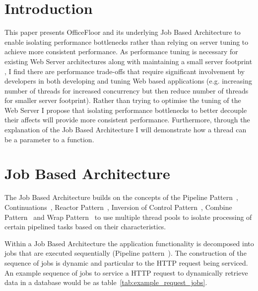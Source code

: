 \documentclass[conference]{ieee/IEEEtran}
\begin{document}
%
\IEEEpeerreviewmaketitle



\section{Introduction}
This paper presents OfficeFloor and its underlying Job Based Architecture to
enable isolating performance bottlenecks rather than relying on server tuning to
achieve more consistent performance. As performance tuning is necessary for
existing Web Server architectures \cite{tuning-important} along with maintaining
a small server footprint \cite{low-server-footprint}, I find there are
performance trade-offs that require significant involvement by developers in
both developing and tuning Web based applications (e.g. increasing number of
threads for increased concurrency but then reduce number of threads for smaller
server footprint).  Rather than trying to optimise the tuning of the Web Server
I propose that isolating performance bottlenecks to better decouple their
affects will provide more consistent performance.  Furthermore, through the
explanation of the Job Based Architecture I will demonstrate how a thread can be
a parameter to a function.


\section{Job Based Architecture}
The Job Based Architecture builds on the concepts of the Pipeline
Pattern~\cite{pipeline}, Continuations~\cite{continuations}, Reactor
Pattern~\cite{reactor}, Inversion of Control Pattern~\cite{ioc}, Combine
Pattern~\cite{pipeline} and Wrap Pattern~\cite{pipeline} to use multiple thread
pools to isolate processing of certain pipelined tasks based on their
characteristics.

Within a Job Based Architecture the application functionality is decomposed into
jobs that are executed sequentially (Pipeline pattern~\cite{pipeline}).  The
construction of the sequence of jobs is dynamic and particular to the HTTP
request being serviced.  An example sequence of jobs to service a HTTP request
to dynamically retrieve data in a database would be as
table~\ref{tab:example_request_jobs}.
\end{document}
